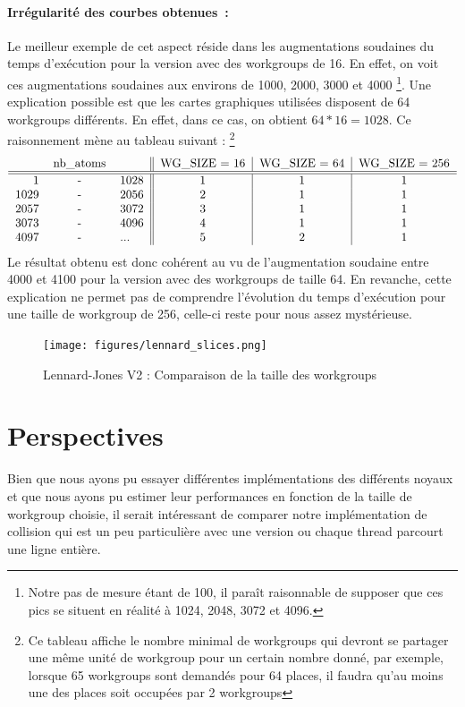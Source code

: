 \documentclass{article}
\begin{document}
\paragraph{Irrégularité des courbes obtenues~:}
Le meilleur exemple de cet aspect réside dans les augmentations soudaines du
temps d'exécution pour la version avec des workgroups de 16. En effet, on
voit ces augmentations soudaines aux environs de 1000, 2000, 3000 et 4000
\footnote{Notre pas de mesure étant de 100, il paraît raisonnable de supposer
que ces pics se situent en réalité à 1024, 2048, 3072 et 4096.}. Une explication
possible est que les cartes graphiques utilisées disposent de 64 workgroups
différents. En effet, dans ce cas, on obtient $64 * 16 = 1028$. Ce raisonnement
mène au tableau suivant :
\footnote{Ce tableau affiche le nombre minimal de workgroups qui devront se
partager une même unité de workgroup pour un certain nombre donné, par exemple,
lorsque 65 workgroups sont demandés pour 64 places, il faudra qu'au moins une
des places soit occupées par 2 workgroups}
$$
  \begin{tabular}{rcl||c|c|c}
    &nb\_atoms&  & WG\_SIZE = 16 & WG\_SIZE = 64 & WG\_SIZE = 256\\
    \hline \hline
       1&-&1028  &       1       &       1       &       1       \\
    1029&-&2056  &       2       &       1       &       1       \\
    2057&-&3072  &       3       &       1       &       1       \\
    3073&-&4096  &       4       &       1       &       1       \\
    4097&-&...   &       5       &       2       &       1
  \end{tabular}
$$
Le résultat obtenu est donc cohérent au vu de l'augmentation soudaine entre
4000 et 4100 pour la version avec des workgroups de taille 64. En revanche,
cette explication ne permet pas de comprendre l'évolution du temps d'exécution
pour une taille de workgroup de 256, celle-ci reste pour nous assez mystérieuse.

\begin{figure}[p]
	\caption{Lennard-Jones V2 : Comparaison de la taille des workgroups}
	\label{lennard-slices}
	\texttt{[image: figures/lennard\_slices.png]}
\end{figure}

\section{Perspectives}
Bien que nous ayons pu essayer différentes implémentations des différents
noyaux et que nous ayons pu estimer leur performances en fonction de la
taille de workgroup choisie, il serait intéressant de comparer notre
implémentation de collision qui est un peu particulière avec une version ou
chaque thread parcourt une ligne entière.
\end{document}
